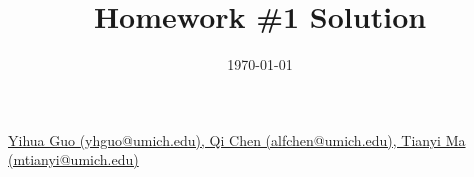 \documentclass{amsart}
\theoremstyle{definition}
\theoremstyle{remark}
\numberwithin{equation}{section}
\begin{document}
\title{Homework \#1 Solution}
	
\date{\today}

\maketitle

 \href{mailto:yhguo@umich.edu,alfchen@umich.edu,mtianyi@umich.edu}
{Yihua Guo (yhguo@umich.edu), 
Qi Chen (alfchen@umich.edu),
Tianyi Ma (mtianyi@umich.edu)}

\bigskip







\end{document}
